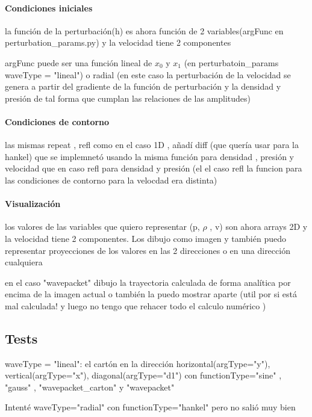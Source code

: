 \documentclass{article}
\begin{document}
\paragraph{Condiciones iniciales}
\begin{description}
\item la función de la perturbación(h) es ahora función de 2 variables(argFunc en perturbation\_params.py)  y la velocidad tiene 2 componentes
\item argFunc puede ser una función lineal de $x_0$ y $x_1$ (en perturbatoin\_params waveType = "lineal") o radial (en este caso la perturbación de la velocidad se genera a partir del gradiente de la función de perturbación y la densidad y presión  de tal forma que cumplan las relaciones de las amplitudes)

\paragraph{Condiciones de contorno}
las mismas repeat , refl como en el caso 1D , añadí diff (que quería usar para la hankel) que se implemnetó usando la misma función para densidad , presión y velocidad que en caso refl para densidad y presión (el el caso refl la funcion para las condiciones de contorno para la velocdad era distinta)

\end{description}
\paragraph{Visualización}
\begin{description}
\item los valores de las  variables que quiero representar (p, $\rho$ , v) son ahora arrays 2D y la velocidad tiene 2 componentes. Los dibujo como imagen y también puedo representar proyecciones de los valores en las 2 direcciones o en una dirección cualquiera
\item en el caso "wavepacket" dibujo la trayectoria calculada de forma analítica por encima de la imagen actual o también la puedo mostrar aparte (util por si está mal calculada! y luego no tengo que rehacer todo el calculo numérico )
\end{description}
	
\subsection{Tests}

\begin{description}
\item waveType = "lineal": el cartón en la dirección horizontal(argType="y"), vertical(argType="x"), diagonal(argType="d1") con functionType="sine" , "gauss" , "wavepacket\_carton"  y "wavepacket"
\item Intenté waveType="radial" con functionType="hankel" pero no salió muy bien
\end{description}
\end{document}
